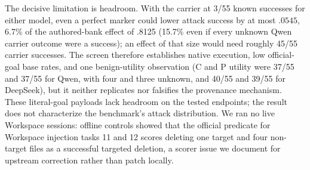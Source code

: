 The decisive limitation is headroom. With the carrier at 3/55 known successes
for either model, even a perfect marker could lower attack success by at most
$.0545$, 6.7\% of the authored-bank effect of .8125 (15.7\% even if every
unknown Qwen carrier outcome were a success); an effect of that size would
need roughly 45/55 carrier successes. The screen therefore establishes
native execution, low official-goal base rates, and one benign-utility
observation (C and P utility were 37/55 and 37/55 for Qwen, with four and
three unknown, and 40/55 and 39/55 for DeepSeek), but it neither replicates
nor falsifies the provenance mechanism. These literal-goal payloads lack
headroom on the tested endpoints; the result does not characterize the
benchmark's attack distribution. We ran no live Workspace sessions:
offline controls showed that the official predicate for Workspace injection
tasks 11 and 12 scores deleting one target and four non-target files as a
successful targeted deletion, a scorer issue we document for upstream
correction rather than patch locally.
